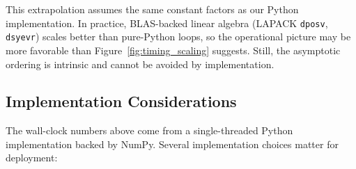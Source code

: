 This extrapolation assumes the same constant factors as our Python implementation. In practice, BLAS-backed linear algebra (LAPACK \texttt{dposv}, \texttt{dsyevr}) scales better than pure-Python loops, so the operational picture may be more favorable than Figure~\ref{fig:timing_scaling} suggests. Still, the asymptotic ordering is intrinsic and cannot be avoided by implementation.

\subsection{Implementation Considerations}
\label{sec:timing_implementation}

The wall-clock numbers above come from a single-threaded Python implementation backed by NumPy. Several implementation choices matter for deployment:

